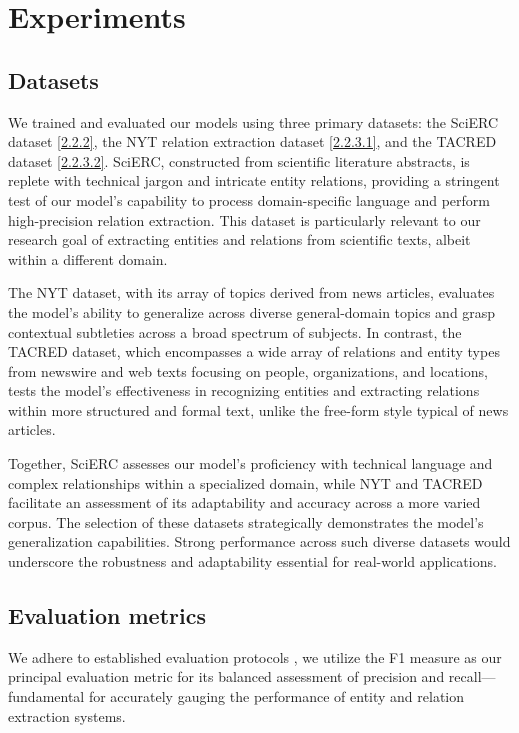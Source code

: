 \chapter{Experiments}
\label{chp:experiments}

\section{Datasets}
We trained and evaluated our models using three primary datasets: the SciERC dataset \hyperref[sec:sciercdataset]{[2.2.2]}, the NYT relation extraction dataset \hyperref[sec:nytdataset]{[2.2.3.1]}, and the TACRED dataset \hyperref[sec:tacreddataset]{[2.2.3.2]}. SciERC, constructed from scientific literature abstracts, is replete with technical jargon and intricate entity relations, providing a stringent test of our model's capability to process domain-specific language and perform high-precision relation extraction. This dataset is particularly relevant to our research goal of extracting entities and relations from scientific texts, albeit within a different domain.

The NYT dataset, with its array of topics derived from news articles, evaluates the model's ability to generalize across diverse general-domain topics and grasp contextual subtleties across a broad spectrum of subjects. In contrast, the TACRED dataset, which encompasses a wide array of relations and entity types from newswire and web texts focusing on people, organizations, and locations, tests the model’s effectiveness in recognizing entities and extracting relations within more structured and formal text, unlike the free-form style typical of news articles.

Together, SciERC assesses our model's proficiency with technical language and complex relationships within a specialized domain, while NYT and TACRED facilitate an assessment of its adaptability and accuracy across a more varied corpus. The selection of these datasets strategically demonstrates the model's generalization capabilities. Strong performance across such diverse datasets would underscore the robustness and adaptability essential for real-world applications.

\section{Evaluation metrics}
We adhere to established evaluation protocols \cite{taille-etal-2020-lets}, we utilize the F1 measure as our principal evaluation metric for its balanced assessment of precision and recall—fundamental for accurately gauging the performance of entity and relation extraction systems.

